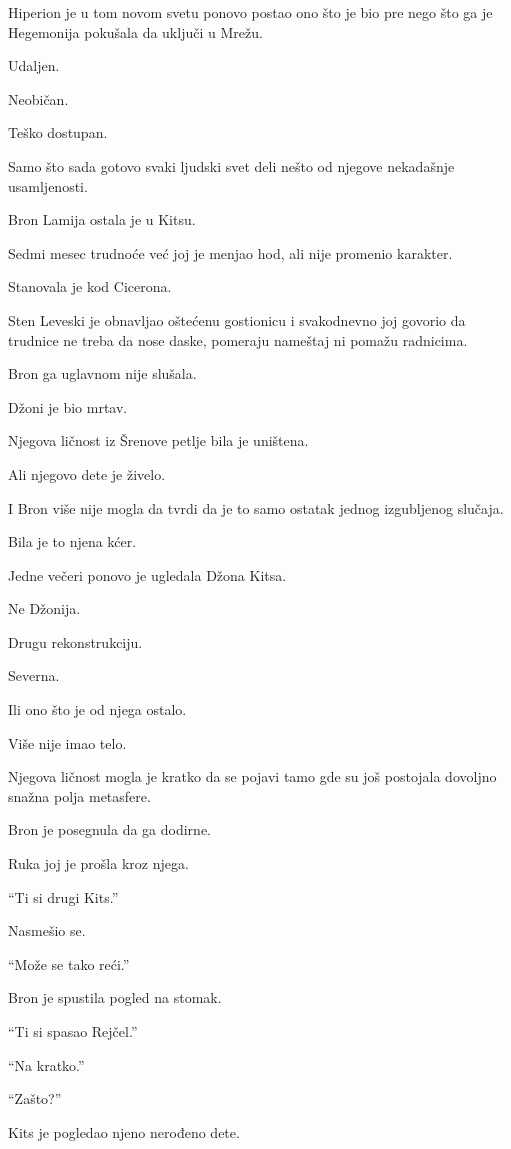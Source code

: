 Hiperion je u tom novom svetu ponovo postao ono što je bio pre nego što ga je Hegemonija pokušala da uključi u Mrežu.

Udaljen.

Neobičan.

Teško dostupan.

Samo što sada gotovo svaki ljudski svet deli nešto od njegove nekadašnje usamljenosti.

\bigskip

Bron Lamija ostala je u Kitsu.

Sedmi mesec trudnoće već joj je menjao hod, ali nije promenio karakter.

Stanovala je kod Cicerona.

Sten Leveski je obnavljao oštećenu gostionicu i svakodnevno joj govorio da trudnice ne treba da nose daske, pomeraju nameštaj ni pomažu radnicima.

Bron ga uglavnom nije slušala.

Džoni je bio mrtav.

Njegova ličnost iz Šrenove petlje bila je uništena.

Ali njegovo dete je živelo.

I Bron više nije mogla da tvrdi da je to samo ostatak jednog izgubljenog slučaja.

Bila je to njena kćer.

\bigskip

Jedne večeri ponovo je ugledala Džona Kitsa.

Ne Džonija.

Drugu rekonstrukciju.

Severna.

Ili ono što je od njega ostalo.

Više nije imao telo.

Njegova ličnost mogla je kratko da se pojavi tamo gde su još postojala dovoljno snažna polja metasfere.

Bron je posegnula da ga dodirne.

Ruka joj je prošla kroz njega.

``Ti si drugi Kits.''

Nasmešio se.

``Može se tako reći.''

Bron je spustila pogled na stomak.

``Ti si spasao Rejčel.''

``Na kratko.''

``Zašto?''

Kits je pogledao njeno nerođeno dete.

